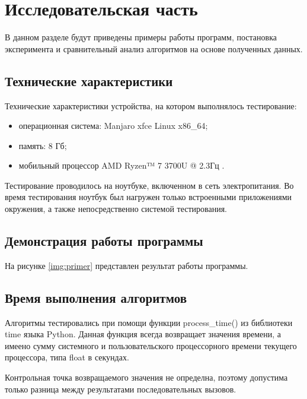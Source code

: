 \chapter{Исследовательская часть}

В данном разделе будут приведены примеры работы программ, постановка эксперимента и сравнительный анализ алгоритмов на основе полученных данных.

\section{Технические характеристики}

Технические характеристики устройства, на котором выполнялось тестирование:

\begin{itemize}
	\item операционная система: Manjaro xfce \cite{ubuntu} Linux \cite{linux} x86\_64;
	\item память: 8 Гб;
	\item мобильный процессор AMD Ryzen™ 7 3700U @ 2.3Гц \cite{intel}.
\end{itemize}

Тестирование проводилось на ноутбуке, включенном в сеть электропитания. Во время тестирования ноутбук был нагружен только встроенными приложениями окружения, а также непосредственно системой тестирования.

\section{Демонстрация работы программы}

На рисунке \ref{img:primer} представлен результат работы программы.

\FloatBarrier

\section{Время выполнения алгоритмов}

Алгоритмы тестировались при помощи функции process\_time() из библиотеки time языка Python. Данная функция всегда возвращает значения времени, а имеено сумму системного и пользовательского процессорного времени текущего процессора, типа float в секундах.

Контрольная точка возвращаемого значения не определна, поэтому допустима только разница между результатами последовательных вызовов.

